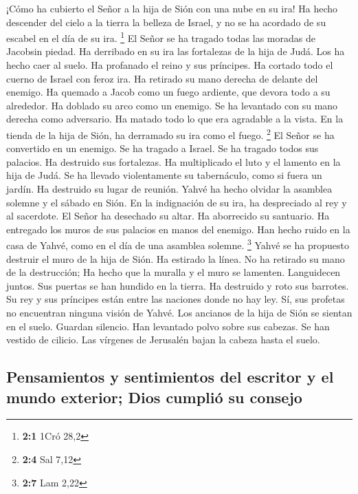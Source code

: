  ¡Cómo ha cubierto el Señor a la hija de Sión con una nube
en su ira! Ha hecho descender del cielo a la tierra la belleza de
Israel, y no se ha acordado de su escabel en el día de su ira.
\footnote{\textbf{2:1} 1Cró 28,2}  El Señor se ha tragado
todas las moradas de Jacobsin piedad. Ha derribado en su ira las
fortalezas de la hija de Judá. Los ha hecho caer al suelo. Ha profanado
el reino y sus príncipes.  Ha cortado todo el cuerno de
Israel con feroz ira. Ha retirado su mano derecha de delante del
enemigo. Ha quemado a Jacob como un fuego ardiente, que devora todo a su
alrededor.  Ha doblado su arco como un enemigo. Se ha
levantado con su mano derecha como adversario. Ha matado todo lo que era
agradable a la vista. En la tienda de la hija de Sión, ha derramado su
ira como el fuego. \footnote{\textbf{2:4} Sal 7,12}  El
Señor se ha convertido en un enemigo. Se ha tragado a Israel. Se ha
tragado todos sus palacios. Ha destruido sus fortalezas. Ha multiplicado
el luto y el lamento en la hija de Judá.  Se ha llevado
violentamente su tabernáculo, como si fuera un jardín. Ha destruido su
lugar de reunión. Yahvé ha hecho olvidar la asamblea solemne y el sábado
en Sión. En la indignación de su ira, ha despreciado al rey y al
sacerdote.  El Señor ha desechado su altar. Ha aborrecido
su santuario. Ha entregado los muros de sus palacios en manos del
enemigo. Han hecho ruido en la casa de Yahvé, como en el día de una
asamblea solemne. \footnote{\textbf{2:7} Lam 2,22}  Yahvé
se ha propuesto destruir el muro de la hija de Sión. Ha estirado la
línea. No ha retirado su mano de la destrucción; Ha hecho que la muralla
y el muro se lamenten. Languidecen juntos.  Sus puertas se
han hundido en la tierra. Ha destruido y roto sus barrotes. Su rey y sus
príncipes están entre las naciones donde no hay ley. Sí, sus profetas no
encuentran ninguna visión de Yahvé.  Los ancianos de la
hija de Sión se sientan en el suelo. Guardan silencio. Han levantado
polvo sobre sus cabezas. Se han vestido de cilicio. Las vírgenes de
Jerusalén bajan la cabeza hasta el suelo.

\hypertarget{pensamientos-y-sentimientos-del-escritor-y-el-mundo-exterior-dios-cumpliuxf3-su-consejo}{%
\subsection{Pensamientos y sentimientos del escritor y el mundo
exterior; Dios cumplió su
consejo}\label{pensamientos-y-sentimientos-del-escritor-y-el-mundo-exterior-dios-cumpliuxf3-su-consejo}}

